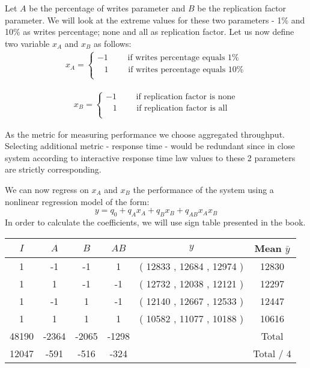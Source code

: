 \documentclass[11pt]{article}
\begin{document}
Let $A$ be the percentage of writes parameter and $B$ be the replication factor parameter. We will look at the extreme values for these two parameters - 1\% and 10\% as writes percentage; none and all as replication factor. Let us now define two variable $x_A$ and $x_B$ as follows:
\begin{gather*}
x_A = 
\begin{cases}
-1 \qquad \text{ if writes percentage equals 1\%} \\ 
\;\;\;1 \qquad \text{ if writes percentage equals 10\%} \\ 
\end{cases}
\end{gather*}

\begin{gather*}
x_B = 
\begin{cases}
-1 \qquad \text{ if replication factor is none} \\ 
\;\;\;1 \qquad \text{ if replication factor is all} \\ 
\end{cases}
\end{gather*}

As the metric for measuring performance we choose aggregated throughput. Selecting additional metric - response time - would be redundant since in close system according to interactive response time law values to these 2 parameters are strictly corresponding.

We can now regress on $x_A$ and $x_B$ the performance of the system using a nonlinear regression model of the form:
$$y = q_0 + q_Ax_A + q_Bx_B + q_{AB}x_Ax_B$$
In order to calculate the coefficients, we will use sign table presented in the book.
\medskip

\begin{center}
\begin{tabular}{|c|c|c|c|c|c|}
\hline $I$ & $A$ & $B$ & $AB$ & $y$ &Mean $\bar{y}$ \\
\hline	1	&	-1	&	-1	&	1	&	(	12833	,	12684	,	12974	) &	12830	\\
\hline	1	&	1	&	-1	&	-1	&	(	12732	,	12038	,	12121	) &	12297	\\
\hline	1	&	-1	&	1	&	-1	&	(	12140	,	12667	,	12533	) &	12447	\\
\hline	1	&	1	&	1	&	1	&	(	10582	,	11077	,	10188	) &	10616	\\
\hline	48190	&	-2364	&	-2065	&	-1298	&							&	Total	\\
\hline	12047	&	-591	&	-516	&	-324	&							&	Total / 4	\\
\hline
\end{tabular}
\end{center}
\medskip
\end{document}
